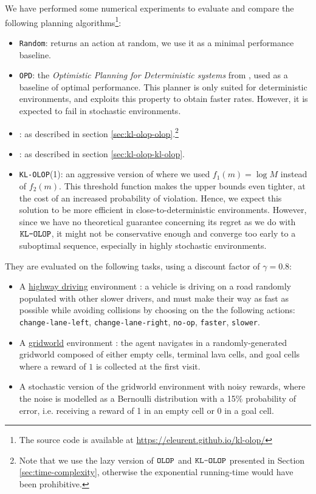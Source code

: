 \documentclass[runningheads]{llncs}
\newcommand{\citep}{\cite}
\begin{document}
We have performed some numerical experiments to evaluate and compare the following planning algorithms\footnote[1]{The source code is available at \url{https://eleurent.github.io/kl-olop/}}:
\begin{itemize}
    \item \texttt{Random}: returns an action at random, we use it as a minimal performance baseline.
    \item \texttt{OPD}: the \emph{Optimistic Planning for Deterministic systems} from \citep{Hren2008}, used as a baseline of optimal performance. This planner is only suited for deterministic environments, and exploits this property to obtain faster rates. However, it is expected to fail in stochastic environments.
    \item \OLOP: as described in section \ref{sec:kl-olop-olop}.\footnote[2]{Note that we use the lazy version of $\texttt{OLOP}$ and $\texttt{KL-OLOP}$ presented in Section \ref{sec:time-complexity}, otherwise the exponential running-time would have been prohibitive.}
    \item \KLOLOP: as described in section \ref{sec:kl-olop-kl-olop}.\footnotemark[2]
    \item \texttt{KL-OLOP}(1): an aggressive version of \KLOLOP where we used $f_1(m) = \log M$ instead of $f_2(m)$. This threshold function makes the upper bounds even tighter, at the cost of an increased probability of violation. Hence, we expect this solution to be more efficient in close-to-deterministic environments. However, since we have no theoretical guarantee concerning its regret as we do with $\texttt{KL-OLOP}$, it might not be conservative enough and converge too early to a suboptimal sequence, especially in highly stochastic environments.
\end{itemize}

They are evaluated on the following tasks, using a discount factor of $\gamma=0.8$:
\begin{itemize}
    \item A \href{https://github.com/eleurent/highway-env/}{highway driving} environment \citep{Leurent2018}: a vehicle is driving on a road randomly populated with other slower drivers, and must make their way as fast as possible while avoiding collisions by choosing on the the following actions: \texttt{change-lane-left}, \texttt{change-lane-right}, \texttt{no-op}, \texttt{faster}, \texttt{slower}.
    \item A \href{https://github.com/maximecb/gym-minigrid}{gridworld} environment \citep{gym_minigrid}: the agent navigates in a randomly-generated gridworld composed of either empty cells, terminal lava cells, and goal cells where a reward of $1$ is collected at the first visit.
    \item A stochastic version of the gridworld environment with noisy rewards, where the noise is modelled as a Bernoulli distribution with a 15\% probability of error, i.e. receiving a reward of 1 in an empty cell or 0 in a goal cell.
\end{itemize}
\end{document}
